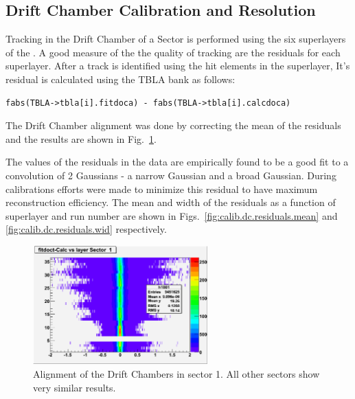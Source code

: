 \subsection{\label{sec:calib.dc}Drift Chamber Calibration and Resolution}

Tracking in the Drift Chamber of a  Sector is performed using the six superlayers of the . A good measure of the the quality of tracking are the  residuals for each superlayer. After a track is identified using the hit elements in the  superlayer, It's  residual is calculated using the TBLA bank as follows:

\begin{verbatim}
fabs(TBLA->tbla[i].fitdoca) - fabs(TBLA->tbla[i].calcdoca)
\end{verbatim}

\begin{v2}The Drift Chamber alignment was done by correcting the mean of the residuals and the results are shown in Fig.~\ref{fig:dc.align}.\end{v2}  The values of the  residuals in the  data are empirically found to be a good fit to a convolution of 2 Gaussians - a narrow Gaussian and a broad Gaussian. During  calibrations efforts were made to minimize this residual to have maximum reconstruction efficiency. The mean and width of the residuals as a function of superlayer and run number are shown in Figs.~\ref{fig:calib.dc.residuals.mean} and \ref{fig:calib.dc.residuals.wid} respectively.

\begin{figure}\begin{center}
\includegraphics[width=0.6\textwidth]{figures/calib/dc/dc_align1.eps}
\caption[DC Alignment]{\label{fig:dc.align}Alignment of the Drift Chambers in sector 1. All other sectors show very similar results.}
\end{center}\end{figure}

